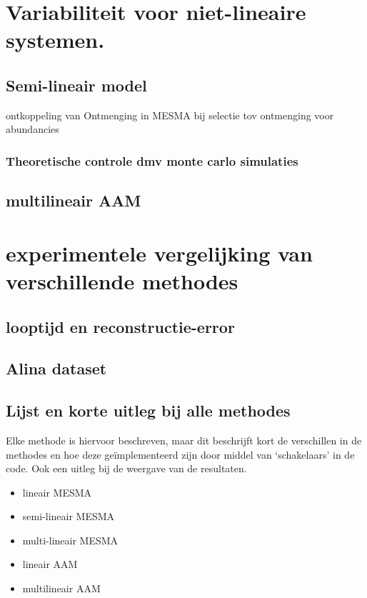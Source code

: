 \documentclass[12pt]{report}
\begin{document}
\chapter{Variabiliteit voor niet-lineaire systemen.}

\section{Semi-lineair model}

ontkoppeling van Ontmenging in MESMA bij selectie tov ontmenging voor abundancies

\subsection{Theoretische controle dmv monte carlo simulaties}

\section{multilineair AAM}

\chapter{experimentele vergelijking van verschillende methodes}

\section{looptijd en reconstructie-error}

\section{Alina dataset}

\section{Lijst en korte uitleg bij alle methodes}

Elke methode is hiervoor beschreven, maar dit beschrijft kort de verschillen in de methodes en hoe deze ge\"implementeerd zijn door middel van `schakelaars' in de code. Ook een uitleg bij de weergave van de resultaten. 

\begin{itemize}
\item lineair MESMA
\item semi-lineair MESMA
\item multi-lineair MESMA
\item lineair AAM
\item multilineair AAM
\end{itemize}
\end{document}
